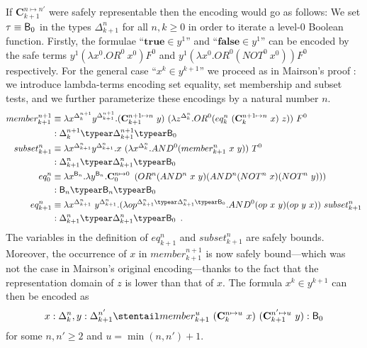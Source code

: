 If $\mathbf{C}^{n\mapsto n'}_{k+1}$ were safely representable then the encoding would go as follows: We set $\tau \equiv \mathsf{B}_0$ in the types  $\Delta_{k+1}^n$ for all $n,k\geq 0$ in order to iterate a level-$0$ Boolean function.
Firstly, the formulae ``$\mathbf{true} \in y^1$'' and ``$\mathbf{false} \in y^1$'' can be encoded by the safe terms $y^1 (\lambda x^0 . OR^0~x^0) F^0$ and $y^1 (\lambda x^0. OR^0(NOT^0~x^0)) F^0$ respectively.
For the general case ``$x^k\in y^{k+1}$''
 we proceed as in Mairson's proof \cite{mairson1992spt}: we introduce lambda-terms encoding set equality, set membership and subset tests, and we further parameterize these encodings by a natural number $n$.
\begin{align*}
member_{k+1}^{n+1} &\equiv \lambda x^{\Delta_k^{n+1}} y^{\Delta_{k+1}^{n+1}}.
(\mathbf{C}_{k+1}^{n+1\mapsto n}~y)~(\lambda z^{\Delta_k^n} . OR^0 (eq_k^n~(\mathbf{C}^{n+1\mapsto n}_k~x)~z))~F^0\\
  & : \Delta_k^{n+1} \typear \Delta_{k+1}^{n+1} \typear \booltype_0
\\
subset_{k+1}^n &\equiv \lambda x^{\Delta_{k+1}^n} y^{\Delta_{k+1}^n}.
x~(\lambda x^{\Delta_k^n} . AND^0 (member_{k+1}^n~x~y))~T^0 \\
  & : \Delta_{k+1}^n \typear \Delta_{k+1}^n \typear\booltype_0
\\
eq_0^n &\equiv \lambda x^{\booltype_n} .\lambda y^{\booltype_n}. \mathbf{C}_0^{n\mapsto 0}~ \left(OR^n (AND^n~x~y) (AND^n (NOT^n~x)(NOT^n~y))\right) \\
 &: \booltype_n \typear \booltype_n \typear\booltype_0
\\
eq_{k+1}^n &\equiv \lambda x^{\Delta_{k+1}^n}~ y^{\Delta_{k+1}^n}.
   (\lambda op^{\Delta_{k+1}^n\typear\Delta_{k+1}^n\typear\booltype_0}. AND^0 (op~x~y)(op~y~x))~subset_{k+1}^n \\
  & : \Delta_{k+1}^n \typear \Delta_{k+1}^n \typear \booltype_0 \enspace .
\end{align*}
The variables in the definition of $eq_{k+1}^n$ and $subset_{k+1}^n$
are safely bounds. Moreover, the occurrence of $x$ in
$member_{k+1}^{n+1}$ is now safely bound---which was not the case in
Mairson's original encoding---thanks to the fact that the
representation domain of $z$ is lower than that of $x$. The formula
$x^k\in y^{k+1}$ can then be encoded as
$$x:\Delta_k^n, y:\Delta_{k+1}^{n'}\stentail member_{k+1}^{u}~ (\mathbf{C}_k^{n\mapsto u}~x)~(\mathbf{C}^{n'\mapsto u}_{k+1} ~y) : \booltype_0$$
for some $n,n'\geq 2$ and $u = \min(n,n')+1$.


